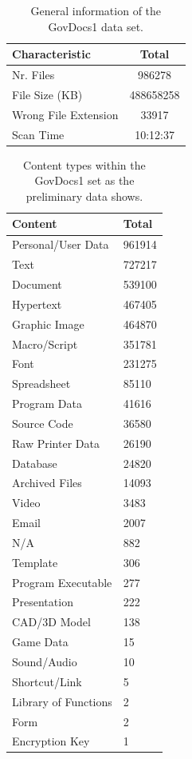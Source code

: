 \begin{table}[b]
\centering
\begin{tabular}{l || c }
\hline
Characteristic & Total \\
\hline
\hline
Nr. Files & 986278 \\
File Size (KB) & 488658258 \\
Wrong File Extension & 33917 \\
Scan Time & 10:12:37 \\
\hline
\end{tabular}
\caption{General information of the GovDocs1 data set.}
\label{tab:govdoc1_general_info}
\end{table}

\begin{table}
\centering
\begin{tabular}{l || l }
\hline
Content & Total \\
\hline
\hline
  Personal/User Data & 961914\\
  Text & 727217 \\
  Document & 539100 \\
  Hypertext & 467405 \\
  Graphic Image & 464870 \\
  Macro/Script &    351781 \\
  Font & 231275 \\
  Spreadsheet & 85110\\
  Program Data  &      41616\\
  Source Code & 36580 \\
  Raw Printer Data &  26190 \\
  Database & 24820 \\
  Archived Files & 14093 \\
  Video &  3483 \\
  Email & 2007 \\
  N/A  & 882 \\
  Template & 306\\
  Program Executable & 277\\
  Presentation & 222 \\
  CAD/3D Model & 138 \\
  Game Data &15\\
  Sound/Audio & 10 \\
  Shortcut/Link & 5 \\
  Library of Functions & 2\\
  Form & 2 \\
  Encryption Key  & 1\\
\hline
\end{tabular}
\label{tab:govdoc1_content}
\caption{Content types within the GovDocs1 set as the preliminary data shows.}
\end{table}

